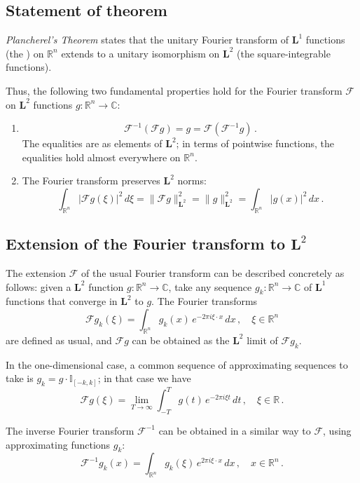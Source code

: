 \documentclass[12pt]{article}
\newcommand{\complex}{\mathbb{C}}
\newcommand{\real}{\mathbb{R}}
\newcommand{\Le}{\mathbf{L}}
\newcommand{\FT}{\mathcal{F}}
\newcommand{\indc}{\mathbb{I}}
\providecommand{\abs}[1]{\lvert#1\rvert}
\providecommand{\norm}[1]{\lVert#1\rVert}
\begin{document}

\subsection{Statement of theorem}

\emph{Plancherel's Theorem} states that 
the unitary Fourier transform of $\Le^1$ functions 
(the ) on $\real^n$
extends to a unitary isomorphism on $\Le^2$ (the square-integrable functions).

Thus, the following two fundamental properties hold
for the Fourier transform $\FT$ on 
$\Le^2$ functions $g \colon \real^n \to \complex$:
\begin{enumerate}[i]
\item
\[
\FT^{-1} (\FT g) = g = \FT( \FT^{-1} g )\,.
\]
The equalities are as elements of $\Le^2$; in terms of pointwise functions,
the equalities hold almost everywhere on $\real^n$.
\item
The Fourier transform preserves $\Le^2$ norms:
\[
\int_{\real^n} \abs{\FT g(\xi)}^2 \, d\xi
= \norm{ \FT g }_{\Le^2}^2 = \norm{g}_{\Le^2}^2
= \int_{\real^n} \abs{g(x)}^2 \, dx\,.
\]
\end{enumerate}

\subsection{Extension of the Fourier transform to $\Le^2$}

The extension $\FT$ of the usual 
Fourier transform can be described concretely as follows: given a $\Le^2$ function $g\colon \real^n \to \complex$,
take any sequence $g_k \colon \real^n \to \complex$
of $\Le^1$ functions that converge in $\Le^2$ to $g$.
The Fourier transforms
\[
\FT g_k (\xi) = \int_{\real^n} g_k(x) \, e^{-2\pi i \xi \cdot x} \, dx\,,
\quad \xi \in \real^n
\]
are defined as usual,
and $\FT g$ can be obtained as the $\Le^2$ limit 
of $\FT g_k$.

In the one-dimensional case, a 
common sequence of approximating sequences to take is
$g_k = g \cdot \indc_{[-k,k]}$; in that case we have
\[
\FT g(\xi) = \lim_{T \to \infty} \int_{-T}^T g(t) \, e^{-2\pi i \xi t} \, dt\,,
\quad \xi \in \real\,.
\]

The inverse Fourier transform $\FT^{-1}$ can be obtained in a similar way
to $\FT$, using approximating functions $g_k$:
\[
\FT^{-1} g_k (x) = \int_{\real^n} g_k(\xi) \, e^{2\pi i \xi \cdot x} \, dx\,,
\quad x \in \real^n\,.
\]
\end{document}
